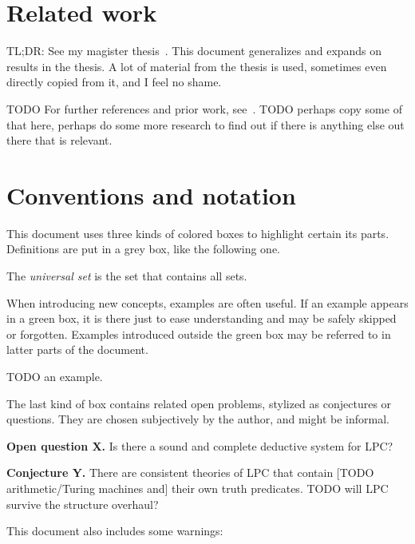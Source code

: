 \documentclass[oneside,12pt]{book}
\newcounter{question}
\theoremstyle{definition}
\theoremstyle{remark}
\begin{document}
\section{Related work}
TL;DR: See my magister thesis~\cite{MikusinecMgrThesis}. This document generalizes
and expands on results in the thesis. A lot of material from the thesis is used,
sometimes even directly copied from it, and I feel no shame.

TODO For further references and prior work, see~\cite{MikusinecMgrThesis}.
TODO perhaps copy some of that here, perhaps do some more research to find out
if there is anything else out there that is relevant.

\section{Conventions and notation}

This document uses three kinds of colored boxes to highlight certain its parts.
Definitions are put in a grey box, like the following one.

\medskip \begin{defBox}
  The \textit{universal set} is the set that contains all sets.
\end{defBox}

When introducing new concepts, examples are often useful. If an example
appears in a green box, it is there just to ease understanding and may be
safely skipped or forgotten. Examples introduced outside the green box
may be referred to in latter parts of the document.

\begin{exampleBox}
  TODO an example.
\end{exampleBox}

The last kind of box contains related open problems, stylized as conjectures
or questions. They are chosen subjectively by the author, and might be informal.

\begin{questionBox}
  \textbf{\color{black}Open question X.} Is there a sound and complete deductive
  system for LPC?
  
  \medskip \noindent
  \textbf{\color{black}Conjecture Y.} There are consistent theories of LPC that
  contain [TODO arithmetic/Turing machines and] their own truth predicates.
  TODO will LPC survive the structure overhaul?
\end{questionBox}

This document also includes some warnings:
\end{document}
